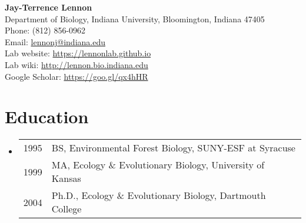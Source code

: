 \documentclass[11pt]{article}
\begin{document}
\begin{center}
  \textbf{Jay-Terrence Lennon} \\
  Department of Biology, Indiana University, Bloomington, Indiana 47405 \\
  Phone: (812) 856-0962 \\
  Email: \href{mailto:lennonj@indiana.edu}{lennonj@indiana.edu} \\
  Lab website: \href{https://lennonlab.github.io}{https://lennonlab.github.io} \\
  Lab wiki: \href{http://lennon.bio.indiana.edu}{http://lennon.bio.indiana.edu} \\
  Google Scholar: \href{https://goo.gl/qx4hHR}{https://goo.gl/qx4hHR}
\end{center}

\vspace{0.2in}

\section*{Education}
\begin{itemize}[left=0pt,label={}]
  \item \begin{tabular}{@{}p{2cm} p{13cm}}
    1995 & BS, Environmental Forest Biology, SUNY-ESF at Syracuse \\
    1999 & MA, Ecology \& Evolutionary Biology, University of Kansas \\
    2004 & Ph.D., Ecology \& Evolutionary Biology, Dartmouth College \\
  \end{tabular}
\end{itemize}
\end{document}
